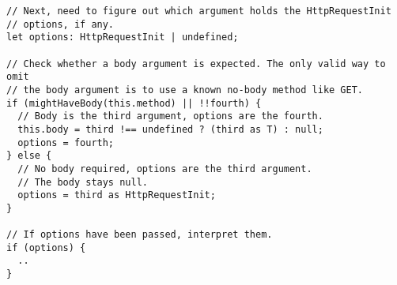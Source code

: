 \begin{verbatim}
// Next, need to figure out which argument holds the HttpRequestInit
// options, if any.
let options: HttpRequestInit | undefined;

// Check whether a body argument is expected. The only valid way to omit
// the body argument is to use a known no-body method like GET.
if (mightHaveBody(this.method) || !!fourth) {
  // Body is the third argument, options are the fourth.
  this.body = third !== undefined ? (third as T) : null;
  options = fourth;
} else {
  // No body required, options are the third argument.
  // The body stays null.
  options = third as HttpRequestInit;
}

// If options have been passed, interpret them.
if (options) {
  ..
}
\end{verbatim}
